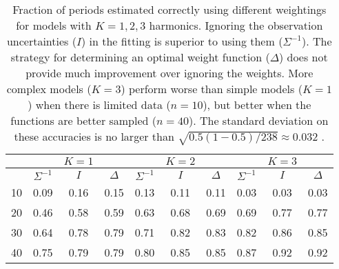 \begin{table}[ht]
\centering
\begin{tabular}{c|ccc|ccc|ccc}
 &  & $K=1$ & &   & $K=2$ &  &  & $K=3$ &  \\ 
  \hline
 & $\Sigma^{-1}$ &  $I$ & $\Delta$ & $\Sigma^{-1}$ &  $I$ & $\Delta$ & $\Sigma^{-1}$ &  $I$ & $\Delta$\\
  \hline10&0.09&0.16&0.15&0.13&0.11&0.11&0.03&0.03&0.03\\20&0.46&0.58&0.59&0.63&0.68&0.69&0.69&0.77&0.77\\30&0.64&0.78&0.79&0.71&0.82&0.83&0.82&0.86&0.85\\40&0.75&0.79&0.79&0.80&0.85&0.85&0.87&0.92&0.92\\\hline
\end{tabular}
\caption{Fraction of periods estimated correctly using different weightings for models with $K=1,2,3$ harmonics. Ignoring the observation uncertainties ($I$) in the fitting is superior to using them ($\Sigma^{-1}$). The strategy for determining an optimal weight function ($\Delta$) does not provide much improvement over ignoring the weights. More complex models ($K=3$) perform worse than simple models ($K=1$) when there is limited data ($n=10$), but better when the functions are better sampled ($n=40$). The standard deviation on these accuracies is no larger than $\sqrt{0.5(1-0.5)/238} \approx 0.032$ .}
\label{tab:period_est_results}
\end{table}
